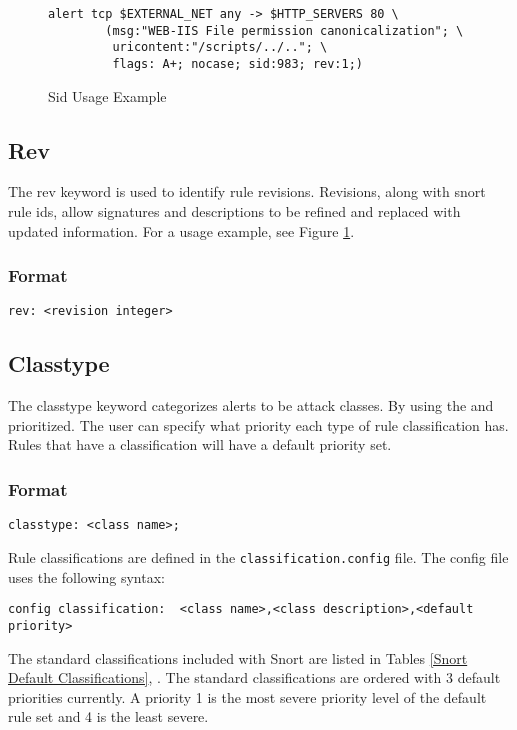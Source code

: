 \documentclass[english]{report}
\begin{document}
%
\begin{figure}[!hbpt]
\begin{verbatim}
alert tcp $EXTERNAL_NET any -> $HTTP_SERVERS 80 \
        (msg:"WEB-IIS File permission canonicalization"; \
         uricontent:"/scripts/../.."; \
         flags: A+; nocase; sid:983; rev:1;)
\end{verbatim}

\caption{\label{sid usage example}Sid Usage Example}
\end{figure}

\subsection{Rev}

The rev keyword is used to identify rule revisions. Revisions, along
with snort rule ids, allow signatures and descriptions to be refined
and replaced with updated information. For a usage example, see Figure
\ref{sid usage example}.


\subsubsection{Format}

\begin{verbatim}
rev: <revision integer>
\end{verbatim}

\subsection{Classtype}

The classtype keyword categorizes alerts to be attack classes. By
using the and prioritized. The user can specify what priority each
type of rule classification has. Rules that have a classification
will have a default priority set. 

\subsubsection{Format}

\begin{verbatim}
classtype: <class name>;
\end{verbatim}
Rule classifications are defined in the \texttt{classification.config}
file. The config file uses the following syntax:

\begin{verbatim}
config classification:  <class name>,<class description>,<default priority>
\end{verbatim}
The standard classifications included with Snort are listed in Tables
\ref{Snort Default Classifications}, . The standard classifications
are ordered with 3 default priorities currently. A priority 1 is the
most severe priority level of the default rule set and 4 is the least
severe.
\end{document}
